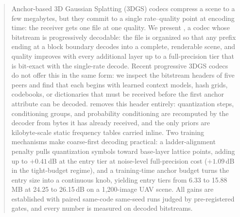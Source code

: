 \begin{abstract}
Anchor-based 3D Gaussian Splatting (3DGS) codecs compress a scene to a few megabytes, but they commit to a single rate--quality point at encoding time: the receiver gets one file at one quality.
We present \DCCA, a codec whose bitstream is progressively decodable: the file is organized so that any prefix ending at a block boundary decodes into a complete, renderable scene, and quality improves with every additional layer up to a full-precision tier that is bit-exact with the single-rate decode.
Recent progressive 3DGS codecs do not offer this in the same form: we inspect the bitstream headers of five peers and find that each begins with learned context models, hash grids, codebooks, or dictionaries that must be received before the first anchor attribute can be decoded.
\DCCA removes this header entirely: quantization steps, conditioning groups, and probability conditioning are recomputed by the decoder from bytes it has already received, and the only priors are kilobyte-scale static frequency tables carried inline.
Two training mechanisms make coarse-first decoding practical: a ladder-alignment penalty pulls quantization symbols toward base-layer lattice points, adding up to $+0.41$\,dB at the entry tier at noise-level full-precision cost ($+1.09$\,dB in the tight-budget regime), and a training-time anchor budget turns the entry size into a continuous knob, yielding entry tiers from 6.33 to 15.88\,MB at 24.25 to 26.15\,dB on a 1{,}200-image UAV scene.
All gains are established with paired same-code same-seed runs judged by pre-registered gates, and every number is measured on decoded bitstreams.
\end{abstract}
